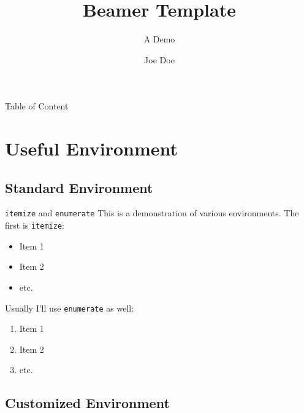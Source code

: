 \documentclass[aspectratio=169, xcolor={dvipsnames}, hyperref={colorlinks=true,linkcolor=themecolor, urlcolor=magenta,citecolor=violet, hyperfootnotes=true}]{beamer}
\title{Beamer Template}
\subtitle{A Demo}
\institute[UD]{University of Delaware}
\author{Joe Doe}
\begin{document}
\begin{frame}
    \titlepage
\end{frame}

\begin{frame}{Table of Content}
    \tableofcontents[hideallsubsections]
\end{frame}


\section{Useful Environment}
\subsection{Standard Environment}
\begin{frame}{\texttt{itemize} and \texttt{enumerate}}
    This is a demonstration of various environments. The first is \texttt{itemize}:

    \begin{itemize}
        \item Item 1
        \item Item 2
        \item etc.
    \end{itemize}

    Usually I'll use \texttt{enumerate} as well:

    \begin{enumerate}
        \item Item 1
        \item Item 2
        \item etc.
    \end{enumerate}
\end{frame}

\subsection{Customized Environment}
\end{document}
